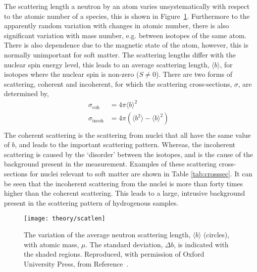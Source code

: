 The scattering length a neutron by an atom varies unsystematically with respect to the atomic number of a species, this is shown in Figure~\ref{fig:scatlen}.
Furthermore to the apparently random variation with changes in atomic number, there is also significant variation with mass number, e.g. between isotopes of the same atom.
There is also dependence due to the magnetic state of the atom, however, this is normally unimportant for soft matter.
The scattering lengths differ with the nuclear spin energy level, this leads to an average scattering length, $\langle b \rangle$, for isotopes where the nuclear spin is non-zero ($S\neq 0$).
There are two forms of scattering, coherent and incoherent, for which the scattering cross-sections, $\sigma$, are determined by,
%
\begin{equation}
    \begin{aligned}
        \sigma_{\text{coh}} & = 4\pi\langle b \rangle ^2 \\
        \sigma_{\text{incoh}} & = 4\pi(\langle b ^ 2 \rangle - \langle b \rangle ^2) \\
    \end{aligned}
\end{equation}
%
The coherent scattering is the scattering from nuclei that all have the same value of $b$, and leads to the important scattering pattern.
Whereas, the incoherent scattering is caused by the `disorder' between the isotopes, and is the cause of the background present in the measurement.
Examples of these scattering cross-sections for nuclei relevant to soft matter are shown in Table \ref{tab:crosssec}.
It can be seen that the incoherent scattering from the  nuclei is more than forty times higher than the coherent scattering.
This leads to a large, intrusive background present in the scattering pattern of hydrogenous samples.
%
\begin{figure}
    \centering
    \texttt{[image: theory/scatlen]}
    \caption{The variation of the average neutron scattering length, $\langle b \rangle$ (circles), with atomic mass, $\mu$. The standard deviation, $\Delta b$, is indicated with the shaded regions. Reproduced, with permission of Oxford University Press\textsuperscript{\textcopyright}, from Reference~\cite{sivia_elementary_2011}.}
    \label{fig:scatlen}
\end{figure}
%
